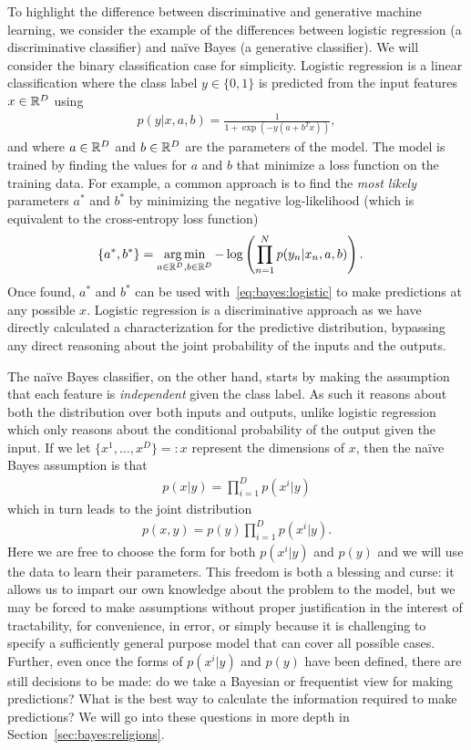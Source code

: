 To highlight the difference between discriminative and generative machine learning, we consider the
example of the differences between logistic regression (a discriminative classifier) and na\"{i}ve Bayes 
(a generative classifier).  We will consider the binary classification case for simplicity.  Logistic regression is a linear
classification where the class label $y \in \{0,1\}$ is predicted from the input features $x \in \mathbb{R}^D$ using
\begin{align}
\label{eq:bayes:logistic}
p(y|x,a,b) = \frac{1}{1+\exp(-y(a+b^Tx))},
\end{align}
and where $a \in \mathbb{R}^D$ and $b \in \mathbb{R}^D$ are the parameters of the model.  The model is trained by finding the values
for $a$ and $b$ that minimize a loss function on the training data.  For example, a common approach
is to find the \emph{most likely} parameters $a^*$ and $b^*$ by minimizing the negative log-likelihood
(which is equivalent to the cross-entropy loss function)
\begin{align}
\{a^*,b^*\} &= \operatorname*{arg\,min}_{a\in \mathbb{R}^D,b\in \mathbb{R}^D} -\log \left(\prod_{n=1}^{N} p(y_n|x_n,a,b)\right).
\end{align}
Once found, $a^*$ and $b^*$ can be used with~\eqref{eq:bayes:logistic} to make predictions at
any possible $x$.  Logistic regression is a discriminative approach as we have directly calculated
a characterization for the predictive distribution, bypassing any direct reasoning about the joint
probability of the inputs and the outputs.

The na\"{i}ve Bayes classifier, on the other hand, starts by making the assumption that each feature
is \emph{independent} given the class label.  As such it reasons about both the distribution over both
inputs and outputs, unlike logistic regression which only reasons about the conditional probability
of the output given the input.   If we let $\{x^1,\dots,x^D\} =: x$ represent the dimensions of $x$, then
the na\"{i}ve Bayes assumption is that
\begin{align}
p(x|y) = \prod_{i=1}^D p(x^i |y)
\end{align}
which in turn leads to the joint distribution
\begin{align}
p(x,y) = p(y) \prod_{i=1}^D p(x^i |y).
\end{align}
Here we are free to choose the form for both $p(x^i |y)$ and $p(y)$ %
and we will use the data to learn their parameters.
This freedom is both a blessing and curse: it allows us to impart our own knowledge about the problem to
the model, but we may be forced to make assumptions without proper justification in the interest
of tractability, for convenience, in error, or simply because it is challenging to specify a sufficiently
general purpose model that can cover all possible cases.
Further, even once the forms of $p(x^i |y)$ and $p(y)$ have been defined, there are still decisions to be
made: do we take a Bayesian or frequentist view for making predictions? What is the best way
to calculate the information required to make predictions?  We will go into these questions in
more depth in Section~\ref{sec:bayes:religions}.

